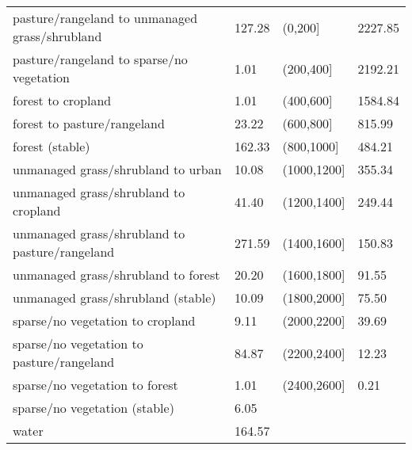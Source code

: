 \begin{longtable}{llll}
pasture/rangeland to unmanaged grass/shrubland     & 127.28        & (0,200{]}                                  & 2227.85          \\
pasture/rangeland to sparse/no vegetation          & 1.01          & (200,400{]}                                & 2192.21          \\
forest to cropland                                 & 1.01          & (400,600{]}                                & 1584.84          \\
forest to pasture/rangeland                        & 23.22         & (600,800{]}                                & 815.99           \\
forest (stable)                                    & 162.33        & (800,1000{]}                               & 484.21           \\
unmanaged grass/shrubland to urban                & 10.08         & (1000,1200{]}                              & 355.34           \\
unmanaged grass/shrubland to cropland             & 41.40         & (1200,1400{]}                              & 249.44           \\
unmanaged grass/shrubland to pasture/rangeland    & 271.59        & (1400,1600{]}                              & 150.83           \\
unmanaged grass/shrubland to forest               & 20.20         & (1600,1800{]}                              & 91.55            \\
unmanaged grass/shrubland (stable)                & 10.09         & (1800,2000{]}                              & 75.50            \\
sparse/no vegetation to cropland                   & 9.11          & (2000,2200{]}                              & 39.69            \\
sparse/no vegetation to pasture/rangeland          & 84.87         & (2200,2400{]}                              & 12.23            \\
sparse/no vegetation to forest                     & 1.01          & (2400,2600{]}                              & 0.21             \\
sparse/no vegetation (stable)                      & 6.05          &                                            &                  \\
water                                              & 164.57        &                                            &                  \\

\end{longtable}
